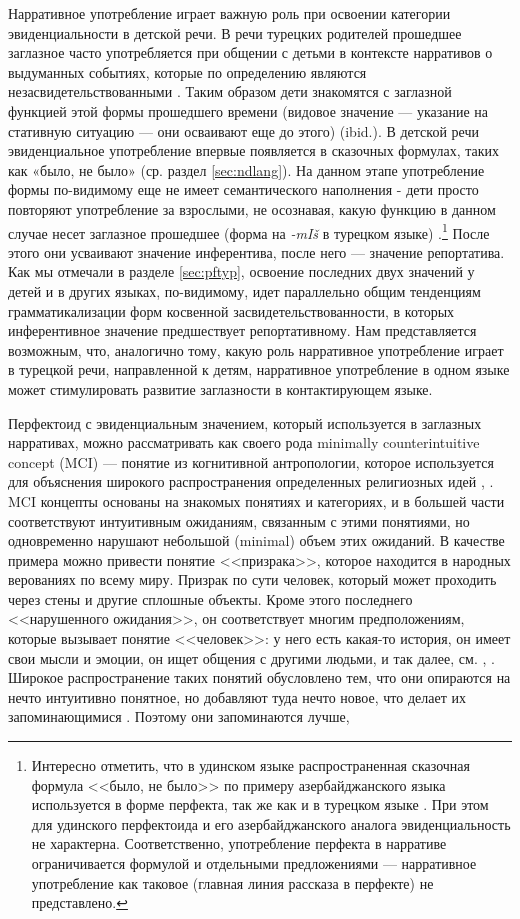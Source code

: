 \par Нарративное употребление играет важную роль при освоении категории эвиденциальности в детской речи. В речи турецких родителей прошедшее заглазное часто употребляется при общении с детьми в контексте нарративов о выдуманных событиях, которые по определению являются незасвидетельствованными \citep{aksu88}. Таким образом дети знакомятся с заглазной функцией этой формы прошедшего времени (видовое значение --- указание на стативную ситуацию --- они осваивают еще до этого) (ibid.). В детской речи эвиденциальное употребление впервые появляется в сказочных формулах, таких как «было, не было» (ср. раздел \ref{sec:ndlang}). На данном этапе употребление формы по-видимому еще не имеет семантического наполнения - дети просто повторяют употребление за взрослыми, не осознавая, какую функцию в данном случае несет заглазное прошедшее (форма на \textit{-mIš} в турецком языке) \citep{aksu2009}.\footnote{Интересно отметить, что в удинском языке распространенная сказочная формула <<было, не было>> по примеру азербайджанского языка используется в форме перфекта, так же как и в турецком языке \citep{maisak2018}. При этом для удинского перфектоида и его азербайджанского аналога эвиденциальность не характерна. Соответственно, употребление перфекта в нарративе ограничивается формулой и отдельными предложениями --- нарративное употребление как таковое (главная линия рассказа в перфекте) не представлено.} После этого они усваивают значение инферентива, после него --- значение репортатива. Как мы отмечали в разделе \ref{sec:pftyp}, освоение последних двух значений у детей и в других языках, по-видимому, идет параллельно общим тенденциям грамматикализации форм косвенной засвидетельствованности, в которых инферентивное значение предшествует репортативному. Нам представляется возможным, что, аналогично тому, какую роль нарративное употребление играет в турецкой речи, направленной к детям, нарративное употребление в одном языке может стимулировать развитие заглазности в контактирующем языке. 
\par Перфектоид с эвиденциальным значением, который используется в заглазных нарративах, можно рассматривать как своего рода minimally counterintuitive concept (MCI) --- понятие из когнитивной антропологии, которое используется для объяснения широкого распространения определенных религиозных идей \citep{boyer2001}, \citep{barrettnyhof2001}. MCI концепты основаны на знакомых понятиях и категориях, и в большей части соответствуют интуитивным ожиданиям, связанным с этими понятиями, но одновременно нарушают небольшой (minimal) объем этих ожиданий. В качестве примера можно привести понятие <<призрака>>, которое находится в народных верованиях по всему миру. Призрак по сути человек, который может проходить через стены и другие сплошные объекты. Кроме этого последнего <<нарушенного ожидания>>, он соответствует многим предположениям, которые вызывает понятие <<человек>>: у него есть какая-то история, он имеет свои мысли и эмоции, он ищет общения с другими людьми, и так далее, см. \citep{barrettnyhof2001}, \citep{boyer2001}. Широкое распространение таких понятий обусловлено тем, что они опираются на нечто интуитивно понятное, но добавляют туда нечто новое, что делает их запоминающимися \citep[72]{barrettnyhof2001}. Поэтому они запоминаются лучше,
